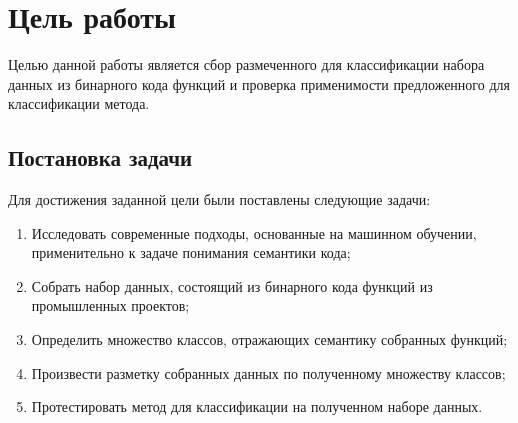 \section{Цель работы}
Целью данной работы является сбор размеченного для классификации набора данных из бинарного кода функций и проверка применимости предложенного для классификации метода. 

\subsection{Постановка задачи}
Для достижения заданной цели были поставлены следующие задачи:
\begin{enumerate}
	\item Исследовать современные подходы, основанные на машинном обучении, применительно к задаче понимания семантики кода;
	\item Собрать набор данных, состоящий из бинарного кода функций из промышленных проектов;
	\item Определить множество классов, отражающих семантику собранных функций;
	\item Произвести разметку собранных данных по полученному множеству классов;
	\item Протестировать метод для классификации на полученном наборе данных.
\end{enumerate}